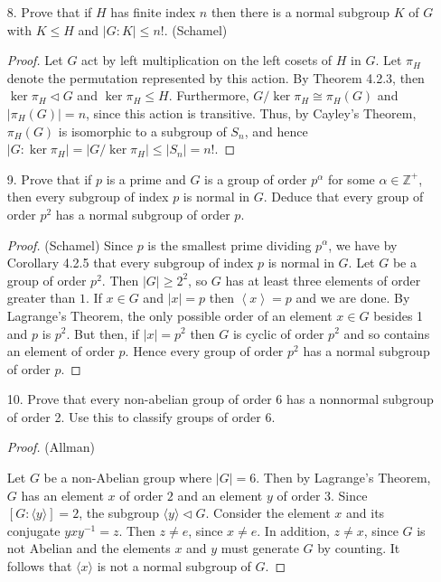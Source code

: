 \documentclass[10pt]{article}
\newcommand{\Z}{\mathbb{Z}}
\newcommand{\normsub}{\triangleleft}
\newcommand{\gen}[1]{\left\langle #1 \right\rangle}
\begin{document}
\begin{itemize}

\item[8.]  Prove that if $H$ has finite index $n$ then there is a normal subgroup $K$ of $G$ with $K \leq H$ and $|G : K| \leq n!$.
(Schamel)
\begin{proof}
Let $G$ act by left multiplication on the left cosets of $H$ in $G$.
Let $\pi_H$ denote the permutation represented by this action.  By
Theorem 4.2.3, then $\ker \pi_H \normsub G$ and $\ker \pi_H \leq H$.
Furthermore, $G/\ker \pi_H \cong \pi_H(G)$ and $|\pi_H(G)| = n$,
since this action is transitive.  Thus, by Cayley's Theorem,
$\pi_H(G)$ is isomorphic to a subgroup of $S_n$, and hence $|G :
\ker \pi_H| = |G/\ker \pi_H| \leq |S_n| = n!$.
\end{proof}

\item[9.]  Prove that if $p$ is a prime and $G$ is a group of order $p^\alpha$ for some $\alpha \in \Z^+$, then every subgroup of index $p$ is normal in $G$.  Deduce that every group of order $p^2$ has a normal subgroup of order $p$.

\begin{proof}(Schamel)
Since $p$ is the smallest prime dividing $p^\alpha$, we have by
Corollary 4.2.5 that every subgroup of index $p$ is normal in $G$.
Let $G$ be a group of order $p^2$.  Then $|G| \geq 2^2$, so $G$ has
at least three elements of order greater than $1$.  If $x \in G$ and
$|x| = p$ then $\gen{x} = p$ and we are done.  By Lagrange's
Theorem, the only possible order of an element $x \in G$ besides 1
and $p$ is $p^2$.  But then, if $|x| = p^2$ then $G$ is cyclic of
order $p^2$ and so contains an element of order $p$.  Hence every
group of order $p^2$ has a normal subgroup of order $p$.
\end{proof}


\item[10.]  Prove that every non-abelian group of order 6 has a nonnormal subgroup of order 2.  Use this to classify groups of order 6.

\begin{proof}(Allman)

Let $G$ be a non-Abelian group where $|G|=6$. Then by Lagrange's
Theorem, $G$ has an element $x$ of order $2$ and an element $y$ of
order $3$.  Since $[G : \langle y \rangle] = 2$, the subgroup
$\langle y \rangle \lhd G$.  Consider the element $x$ and its
conjugate $y x y^{-1} = z$.  Then $z \neq e$, since $x \neq e$. In
addition, $z \neq x$, since $G$ is not Abelian and the elements $x$
and $y$ must generate $G$ by counting.  It follows that $\langle x
\rangle$ is not a normal subgroup of $G$.


\end{proof}
\end{itemize}
\end{document}
